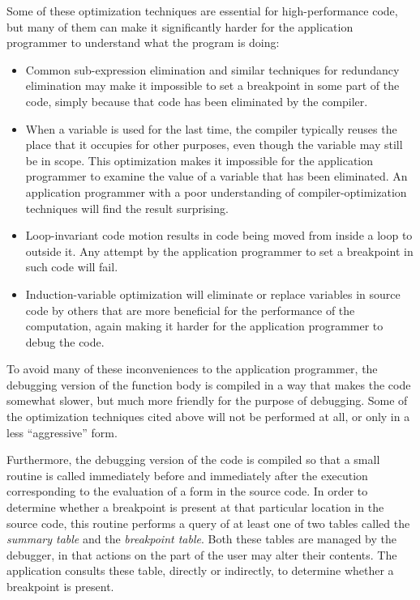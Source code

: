 Some of these optimization techniques are essential for
high-performance code, but many of them can make it significantly
harder for the application programmer to understand what the
program is doing:

\begin{itemize}
\item Common sub-expression elimination and similar techniques for
  redundancy elimination may make it impossible to set
  a breakpoint in some part of the code, simply because that code has
  been eliminated by the compiler.
\item When a variable is used for the last time, the compiler
  typically reuses the place that it occupies for other purposes, even
  though the variable may still be in scope.  This optimization makes
  it impossible for the application programmer to examine the value of
  a variable that has been eliminated.  An application programmer with
  a poor understanding of compiler-optimization techniques will find
  the result surprising.
\item Loop-invariant code motion results in code being moved from
  inside a loop to outside it.  Any attempt by the application
  programmer to set a breakpoint in such code will fail.
\item Induction-variable optimization will eliminate or replace
  variables in source code by others that are more beneficial for
  the performance of the computation, again making it harder for the
  application programmer to debug the code.
\end{itemize}

To avoid many of these inconveniences to the application programmer,
the debugging version of the function body is compiled in a way that
makes the code somewhat slower, but much more friendly for the purpose
of debugging.  Some of the optimization techniques cited above will
not be performed at all, or only in a less ``aggressive'' form.

Furthermore, the debugging version of the code is compiled so that a
small routine is called immediately before and immediately after the
execution corresponding to the evaluation of a form in the source
code.  In order to determine whether a breakpoint is present at that
particular location in the source code, this routine performs a query
of at least one of two tables called the \emph{summary table} and the
\emph{breakpoint table}.  Both these tables are managed by the
debugger, in that actions on the part of the user may alter their
contents.  The application consults these table, directly or
indirectly, to determine whether a breakpoint is present.

